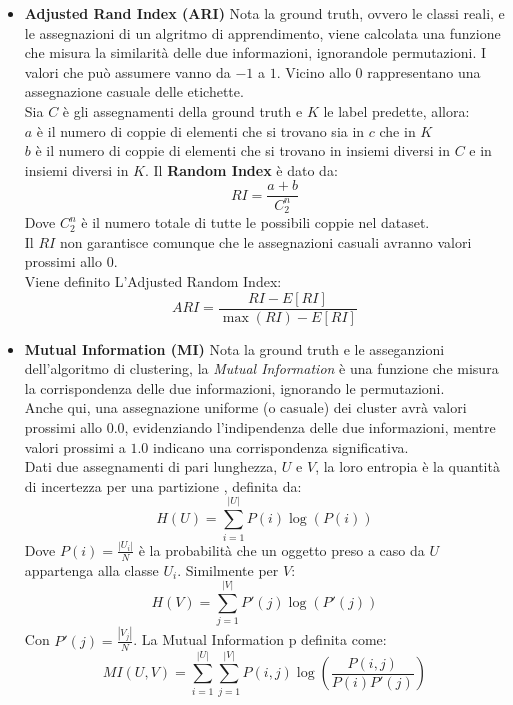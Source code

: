\begin{itemize}
\item \textbf{Adjusted Rand Index (ARI)}
Nota la ground truth, ovvero le classi reali, e le assegnazioni di un algritmo di apprendimento, viene calcolata una funzione che misura la similarità delle due informazioni, ignorandole permutazioni. I valori che può assumere vanno da $-1$ a $1$. Vicino allo $0$ rappresentano una assegnazione casuale delle etichette.
\\
Sia $C$ è gli assegnamenti della ground truth e $K$ le label predette, allora:
\\
$a$ è il numero di coppie di elementi che si trovano sia in $c$ che in $K$
\\
$b$ è il numero di coppie di elementi che si trovano in insiemi diversi in $C$ e in insiemi diversi in $K$.
Il \textbf{Random Index} è dato da:
\begin{equation}
RI = \frac{a + b}{C_2^n}
\end{equation}
Dove $C_2^n$ è il numero totale di tutte le possibili coppie nel dataset. 
\\
Il $RI$ non garantisce comunque che le assegnazioni casuali avranno valori prossimi allo $0$.
\\ Viene definito L'Adjusted Random Index:
\begin{equation}
ARI = \frac{RI - E[RI]}{\max (RI) - E[RI]}
\end{equation}

\item \textbf{Mutual Information (MI)}
Nota la ground truth e le asseganzioni dell'algoritmo di clustering, la \textit{Mutual Information} è una funzione che misura la corrispondenza delle due informazioni, ignorando le permutazioni. 
\\
Anche qui, una assegnazione uniforme (o casuale) dei cluster avrà valori prossimi allo $0.0$, evidenziando l'indipendenza delle due informazioni, mentre valori prossimi a $1.0$ indicano una corrispondenza significativa.
\\
Dati due assegnamenti di pari lunghezza, $U$ e $V$, la loro entropia è la quantità di incertezza per una partizione , definita da:
\begin{equation}
H(U) = \sum\limits_{i=1}^{|U|} P(i)\log (P(i))
\end{equation}
Dove $P(i) = \frac{|U_i|}{N}$ è la probabilità che un oggetto preso a caso da $U$ appartenga alla classe $U_i$. Similmente per $V$:
\begin{equation}
H(V) = \sum\limits_{j=1}^{|V|} P'(j)\log (P'(j))
\end{equation}
Con $P'(j) = \frac{|V_j|}{N}$. La Mutual Information p definita come:
\begin{equation}
MI(U,V) = \sum\limits_{i=1}^{|U|}\sum\limits_{j=1}^{|V|} P(i,j)\log \left( \frac{P(i,j)}{P(i)P'(j)} \right)
\end{equation}

\end{itemize}


